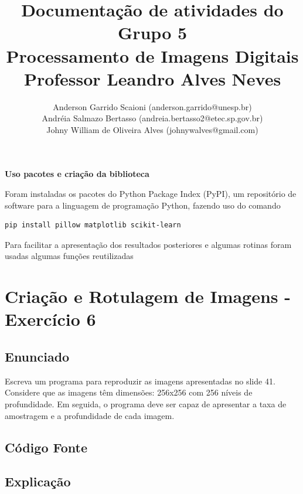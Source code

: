 \documentclass[10pt,a4paper]{article}
\title{Documentação de atividades do Grupo 5 \\ Processamento de Imagens Digitais \\ Professor Leandro Alves Neves}
\author{Anderson Garrido Scaioni (anderson.garrido@unesp.br) \\ Andréia Salmazo Bertasso (andreia.bertasso2@etec.sp.gov.br) \\ Johny William de Oliveira Alves (johnywalves@gmail.com)}
\begin{document}
\maketitle

\begin{flushleft}
\textbf{Uso pacotes e criação da biblioteca}
\end{flushleft}

\begin{flushleft}
Foram instaladas os pacotes do Python Package Index (PyPI), um repositório de software para a linguagem de programação Python, fazendo uso do comando
\end{flushleft}

\begin{lstlisting}[language=Bash]
pip install pillow matplotlib scikit-learn
\end{lstlisting}

\begin{flushleft}
Para facilitar a apresentação dos resultados posteriores e algumas rotinas foram usadas algumas funções reutilizadas
\end{flushleft}



\pagebreak

\section{Criação e Rotulagem de Imagens - Exercício 6}

\subsection{Enunciado}

Escreva um programa para reproduzir as imagens apresentadas no slide 41. Considere que as imagens têm dimensões: 256x256 com 256 níveis de profundidade. Em seguida, o programa deve ser capaz de apresentar a taxa de amostragem e a profundidade de cada imagem.

\subsection{Código Fonte}



\subsection{Explicação}
\end{document}
